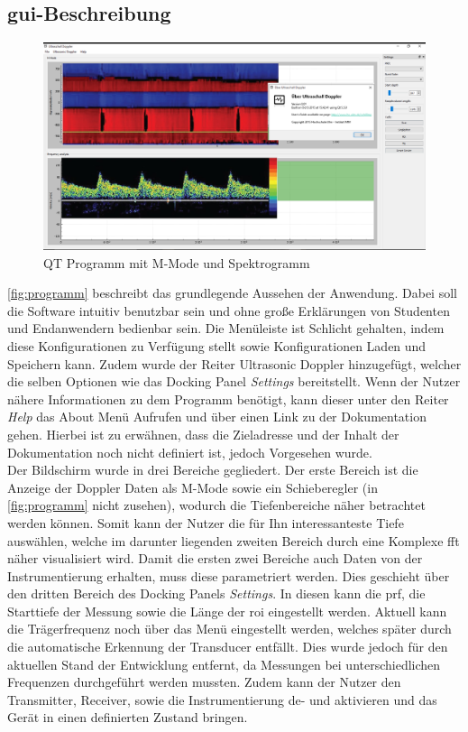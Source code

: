 \subsection{\ac{gui}-Beschreibung}
\begin{figure}[h!]
	\centering
	\includegraphics[width=1\textwidth]{images/software/Programm}%
	\caption[QT Programm mit M-Mode und Spektrogramm]{QT Programm mit M-Mode und Spektrogramm\cite{mmode}}
	\label{fig:programm}
\end{figure}
\autoref{fig:programm} beschreibt das grundlegende Aussehen der Anwendung. Dabei soll die Software intuitiv benutzbar sein und ohne große Erklärungen von Studenten und Endanwendern bedienbar sein. Die Menüleiste ist Schlicht gehalten, indem diese Konfigurationen zu Verfügung stellt sowie Konfigurationen Laden und Speichern kann. Zudem wurde der Reiter Ultrasonic Doppler hinzugefügt, welcher die selben Optionen wie das Docking Panel \textit{Settings} bereitstellt. Wenn der Nutzer nähere Informationen zu dem Programm benötigt, kann dieser unter den Reiter \textit{Help} das About Menü Aufrufen und über einen Link zu der Dokumentation gehen. Hierbei ist zu erwähnen, dass die Zieladresse und der Inhalt der Dokumentation noch nicht definiert ist, jedoch Vorgesehen wurde.\\
Der Bildschirm wurde in drei Bereiche gegliedert. Der erste Bereich ist die Anzeige der Doppler Daten als M-Mode sowie ein Schieberegler (in \autoref{fig:programm} nicht zusehen), wodurch die Tiefenbereiche näher betrachtet werden können. Somit kann der Nutzer die für Ihn interessanteste Tiefe auswählen, welche im darunter liegenden zweiten Bereich durch eine Komplexe \ac{fft} näher visualisiert wird. Damit die ersten zwei Bereiche auch Daten von der Instrumentierung erhalten, muss diese parametriert werden. Dies geschieht über den dritten Bereich des Docking Panels \textit{Settings}. In diesen kann die \ac{prf}, die Starttiefe der Messung sowie die Länge der \ac{roi} eingestellt werden. Aktuell kann die Trägerfrequenz noch über das Menü eingestellt werden, welches später durch die automatische Erkennung der Transducer entfällt. Dies wurde jedoch für den aktuellen Stand der Entwicklung entfernt, da Messungen bei unterschiedlichen Frequenzen durchgeführt werden mussten. Zudem kann der Nutzer den Transmitter, Receiver, sowie die Instrumentierung de- und aktivieren und das Gerät in einen definierten Zustand bringen.\\
